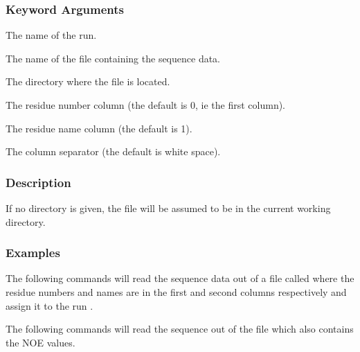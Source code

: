   
 \subsubsection{Keyword Arguments} 

   The name of the run.   

   The name of the file containing the sequence data.   

   The directory where the file is located.   

   The residue number column (the default is 0, ie the first column).   

   The residue name column (the default is 1).   

   The column separator (the default is white space).  

  

  
 \subsubsection{Description} 

 If no directory is given, the file will be assumed to be in the current working directory. 
  

  
 \subsubsection{Examples} 

 The following commands will read the sequence data out of a file called  where the residue numbers and names are in the first and second columns respectively and assign it to the run . 
  




 The following commands will read the sequence out of the file  which also contains the NOE values. 
  



